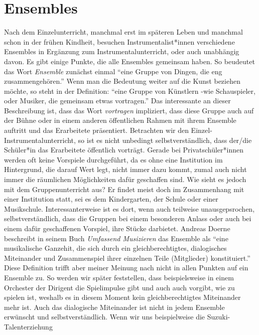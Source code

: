 \section{Ensembles}

Nach dem Einzelunterricht, manchmal erst im späteren Leben und manchmal schon in
der frühen Kindheit, besuchen Instrumentalist*innen verschiedene Ensembles in
Ergänzung zum Instrumentalunterricht, oder auch unabhängig davon. Es gibt einige
Punkte, die alle Ensembles gemeinsam haben. So beudeutet das Wort
\emph{Ensemble} zunächst einmal \enquote{eine Gruppe von Dingen, die eng
zusammengehören.}\autocite{wikipedia:gruppe} Wenn man die Bedeutung weiter auf
die Kunst beziehen möchte, so steht in der Definition: \enquote{eine Gruppe von
Künstlern -wie Schauspieler, oder Musiker, die gemeinsam etwas vortragen.}
\autocite{wikipedia:gruppe} Das interessante an dieser Beschreibung ist, dass
das Wort \emph{vortragen} impliziert, dass diese Gruppe auch auf der Bühne oder
in einem anderen öffentlichen Rahmen mit ihrem Ensemble auftritt und das
Erarbeitete präsentiert. Betrachten wir den Einzel- Instrumentalunterricht, so
ist es nicht unbedingt selbstverständlich, dass der/die Schüler*in das
Erarbeitete öffentlich vorträgt. Gerade bei Privatschüler*innen werden oft keine
Vorspiele durchgeführt, da es ohne eine Institution im Hintergrund, die darauf
Wert legt, nicht immer dazu kommt, zumal auch nicht immer die räumlichen
Möglichkeiten dafür geschaffen sind. Wie sieht es jedoch mit dem
Gruppenunterricht aus? Er findet meist doch im Zusammenhang mit einer
Institution statt, sei es dem Kindergarten, der Schule oder einer Musikschule.
Interessanterweise ist es dort, wenn auch teilweise unausgepsrochen,
selbstverständlich, dass die Gruppen bei einem besonderen Anlass oder auch bei
einem dafür geschaffenen Vorspiel, ihre Stücke darbietet. Andreas Doerne
beschreibt in seinem Buch \emph{Umfassend Musizieren} das Ensemble als
\enquote{eine musikalische Ganzehit, die sich durch ein gleichberechtigtes,
dialogisches Miteinander und Zusammenspiel ihrer einzelnen Teile (Mitglieder)
konstituiert.} \autocite[62]{doerne:umfassend_musizieren} Diese Definition
trifft aber meiner Meinung nach nicht in allen Punkten auf ein Ensemble zu. So
werden wir später feststellen, dass beispielsweise in einem Orchester der
Dirigent die Spielimpulse gibt und auch auch vorgibt, wie zu spielen ist,
weshalb es in diesem Moment kein gleichberechtigtes Miteinander mehr ist. Auch
das dialogische Miteinander ist nicht in jedem Ensemble erwünscht und
selbstverständlich. Wenn wir uns beispielweise die Suzuki-Talenterziehung
